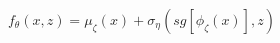 \documentclass[preview]{standalone}
\begin{document}
\begin{align*}
f_\theta (x,z) =  \mu_{\zeta}(x) + \sigma_{\eta}(sg[\phi_\zeta (x)],z)
\end{align*}
\end{document}
